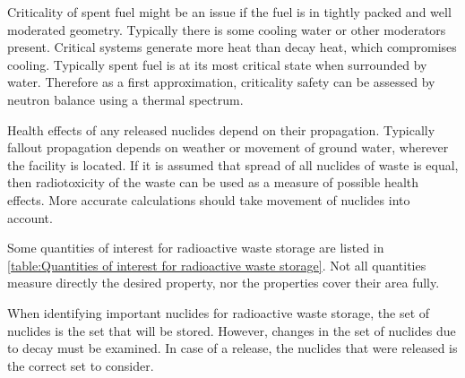Criticality of spent fuel might be an issue if the fuel is in tightly packed and well moderated geometry. Typically there is some cooling water or other moderators present. Critical systems generate more heat than decay heat, which compromises cooling. Typically spent fuel is at its most critical state when surrounded by water. Therefore as a first approximation, criticality safety can be assessed by neutron balance using a thermal spectrum.

Health effects of any released nuclides depend on their propagation. Typically fallout propagation depends on weather or movement of ground water, wherever the facility is located. If it is assumed that spread of all nuclides of waste is equal, then radiotoxicity of the waste can be used as a measure of possible health effects. More accurate calculations should take movement of nuclides into account.

Some quantities of interest for radioactive waste storage are listed in \autoref{table:Quantities of interest for radioactive waste storage}. Not all quantities measure directly the desired property, nor the properties cover their area fully.



When identifying important nuclides for radioactive waste storage, the set of nuclides is the set that will be stored. However, changes in the set of nuclides due to decay must be examined. In case of a release, the nuclides that were released is the correct set to consider.


